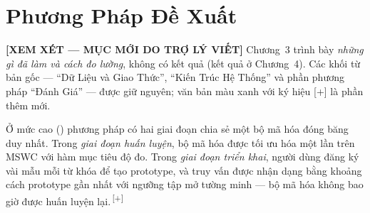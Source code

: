 \documentclass[12pt,a4paper]{report}
\newcommand{\NEW}[1]{{\color{addcolor}#1\,\textsuperscript{\tiny[+]}}}
\newcommand{\reviewnote}[1]{%
  \par\smallskip\noindent
  \colorbox{yellow!35}{\parbox{0.97\linewidth}{\small\textbf{[XEM XÉT — MỤC MỚI DO TRỢ LÝ VIẾT]}\; #1}}%
  \par\smallskip}
\begin{document}
\chapter{Phương Pháp Đề Xuất}\label{ch:method}
\reviewnote{Chương~3 trình bày \emph{những gì đã làm và cách đo lường}, không có
kết quả (kết quả ở Chương~4). Các khối từ bản gốc --- ``Dữ Liệu và Giao Thức'',
``Kiến Trúc Hệ Thống'' và phần phương pháp ``Đánh Giá'' --- được giữ nguyên; văn
bản \textcolor{addcolor}{màu xanh với ký hiệu [+]} là phần thêm mới.}

\NEW{Ở mức cao () phương pháp có hai giai đoạn chia sẻ một bộ
mã hóa đóng băng duy nhất. Trong \emph{giai đoạn huấn luyện}, bộ mã hóa được tối
ưu hóa một lần trên MSWC với hàm mục tiêu độ đo. Trong \emph{giai đoạn triển
khai}, người dùng đăng ký vài mẫu mỗi từ khóa để tạo prototype, và truy vấn được
nhận dạng bằng khoảng cách prototype gần nhất với ngưỡng tập mở tường minh ---
bộ mã hóa không bao giờ được huấn luyện lại.}
\end{document}
